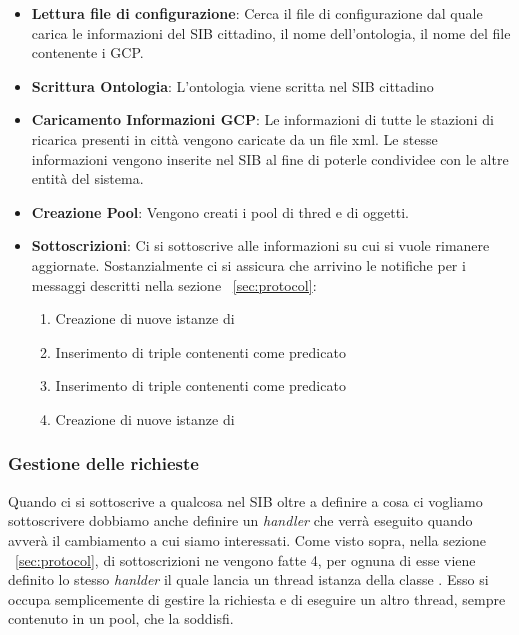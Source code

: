 \begin{itemize}
	\item \textbf{Lettura file di configurazione}: Cerca il file di configurazione  dal quale carica le informazioni del SIB cittadino, il nome dell'ontologia, il nome del file contenente i GCP.
	\item \textbf{Scrittura Ontologia}: L'ontologia viene scritta nel SIB cittadino
	\item \textbf{Caricamento Informazioni GCP}: Le informazioni di tutte le stazioni di ricarica presenti in città vengono caricate da un file xml. Le stesse informazioni vengono inserite nel SIB al fine di poterle condividee con le altre entità del sistema.
	\item \textbf{Creazione Pool}: Vengono creati i pool di thred e di oggetti.
	\item \label{item:subscr} \textbf{Sottoscrizioni}: Ci si sottoscrive alle informazioni su cui si vuole rimanere aggiornate. Sostanzialmente ci si assicura che arrivino le notifiche per i messaggi descritti nella sezione ~\ref{sec:protocol}:
	\begin{enumerate}
		\item Creazione di nuove istanze di 
		\item Inserimento di triple contenenti come predicato 
		\item Inserimento di triple contenenti come predicato 
		\item Creazione di nuove istanze di 
	\end{enumerate}
\end{itemize}

\subsubsection{Gestione delle richieste}

Quando ci si sottoscrive a qualcosa nel SIB oltre a definire a cosa ci vogliamo sottoscrivere dobbiamo anche definire un \emph{handler} che verrà eseguito quando avverà il cambiamento a cui siamo interessati. Come visto sopra, nella sezione ~\ref{sec:protocol}, di sottoscrizioni ne vengono fatte 4, per ognuna di esse viene definito lo stesso \emph{hanlder} il quale lancia un thread istanza della classe . Esso si occupa semplicemente di gestire la richiesta e di eseguire un altro thread, sempre contenuto in un pool, che la soddisfi.

